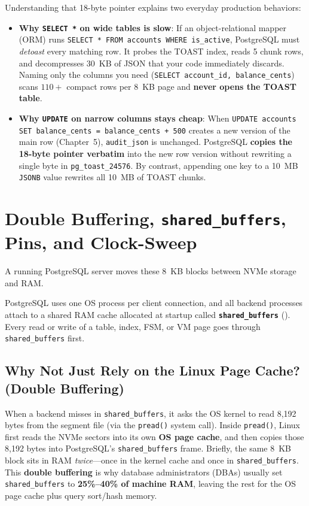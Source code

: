 \begin{applicationbox}
Understanding that 18-byte pointer explains two everyday production behaviors:
\begin{itemize}
  \item \textbf{Why \texttt{SELECT *} on wide tables is slow}: If an object-relational mapper (ORM) runs \texttt{SELECT * FROM accounts WHERE is\_active}, PostgreSQL must \emph{detoast} every matching row. It probes the TOAST index, reads 5 chunk rows, and decompresses 30~KB of JSON that your code immediately discards. Naming only the columns you need (\texttt{SELECT account\_id, balance\_cents}) scans $110+$ compact rows per 8~KB page and \textbf{never opens the TOAST table}.
  \item \textbf{Why \texttt{UPDATE} on narrow columns stays cheap}: When \texttt{UPDATE accounts SET balance\_cents = balance\_cents + 500} creates a new version of the main row (Chapter~5), \texttt{audit\_json} is unchanged. PostgreSQL \textbf{copies the 18-byte pointer verbatim} into the new row version without rewriting a single byte in \texttt{pg\_toast\_24576}. By contrast, appending one key to a 10~MB \texttt{JSONB} value rewrites all 10~MB of TOAST chunks.
\end{itemize}
\end{applicationbox}

\section{Double Buffering, \texttt{shared\_buffers}, Pins, and Clock-Sweep}
\label{sec:ch02-buffer-pool}

A running PostgreSQL server moves these 8~KB blocks between NVMe storage and RAM.

PostgreSQL uses one OS process per client connection, and all backend processes attach to a shared RAM cache allocated at startup called \textbf{\texttt{shared\_buffers}} (). Every read or write of a table, index, FSM, or VM page goes through \texttt{shared\_buffers} first.

\subsection{Why Not Just Rely on the Linux Page Cache? (Double Buffering)}

When a backend misses in \texttt{shared\_buffers}, it asks the OS kernel to read 8,192 bytes from the segment file (via the \texttt{pread()} system call). Inside \texttt{pread()}, Linux first reads the NVMe sectors into its own \textbf{OS page cache}, and then copies those 8,192 bytes into PostgreSQL's \texttt{shared\_buffers} frame. Briefly, the same 8~KB block sits in RAM \emph{twice}---once in the kernel cache and once in \texttt{shared\_buffers}. This \textbf{double buffering} is why database administrators (DBAs) usually set \texttt{shared\_buffers} to \textbf{25\%--40\% of machine RAM}, leaving the rest for the OS page cache plus query sort/hash memory.

